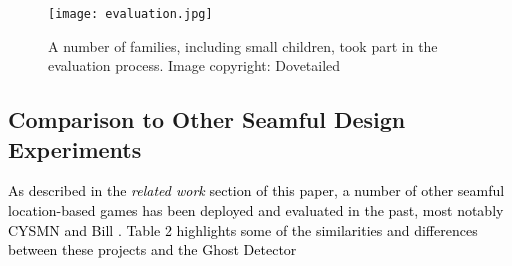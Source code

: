 \documentclass[prodmode,acmtomm]{acmsmall}
\begin{document}
\begin{figure}[h!]
\begin{center}
\begin{center}
\texttt{[image: evaluation.jpg]}
\end{center}
\caption{A number of families, including small children, took part in the evaluation process. Image copyright: Dovetailed}
\end{center}
\vspace{-15pt}
\end{figure}
\subsection{Comparison to Other Seamful Design Experiments}
\textcolor{black}{As described in the \textit{related work} section of this paper, a number of other seamful location-based games has been deployed and evaluated in the past, most notably CYSMN and Bill \cite{benford2002}. Table 2 highlights some of the similarities and differences between these projects and the Ghost Detector}
 
\end{document}
